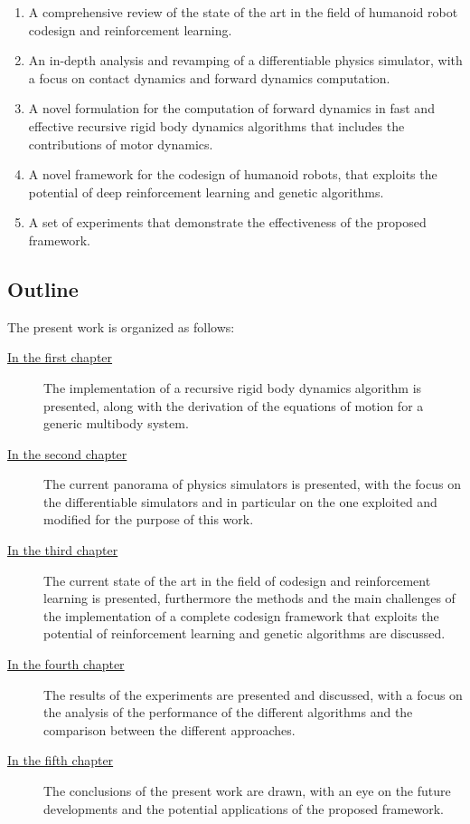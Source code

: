 \begin{enumerate}
    \item A comprehensive review of the state of the art in the field of humanoid robot codesign and reinforcement learning.
    \item An in-depth analysis and revamping of a differentiable physics simulator, with a focus on contact dynamics and forward dynamics computation.
    \item A novel formulation for the computation of forward dynamics in fast and effective recursive rigid body dynamics algorithms that includes the contributions of motor dynamics.
    \item A novel framework for the codesign of humanoid robots, that exploits the potential of deep reinforcement learning and genetic algorithms.
    \item A set of experiments that demonstrate the effectiveness of the proposed framework.
\end{enumerate}


\subsection*{Outline}

The present work is organized as follows:

\begin{description}

    \item[{\hyperref[chp:MotorDynamics]{In the first chapter}}] The implementation of a recursive rigid body dynamics algorithm is presented, along with the derivation of the equations of motion for a generic multibody system.
    \item[{\hyperref[chp:PhysicsSimulators]{In the second chapter}}] The current panorama of physics simulators is presented, with the focus on the differentiable simulators and in particular on the one exploited and modified for the purpose of this work.
    \item[{\hyperref[chp:CodesignRL]{In the third chapter}}] The current state of the art in the field of codesign and reinforcement learning is presented, furthermore the methods and the main challenges of the implementation of a complete codesign framework that exploits the potential of reinforcement learning and genetic algorithms are discussed.
    \item[{\hyperref[chp:ResultsDiscussion]{In the fourth chapter}}] The results of the experiments are presented and discussed, with a focus on the analysis of the performance of the different algorithms and the comparison between the different approaches.
    \item[{\hyperref[chp:Conclusions]{In the fifth chapter}}] The conclusions of the present work are drawn, with an eye on the future developments and the potential applications of the proposed framework.

\end{description}